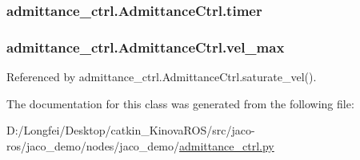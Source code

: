 \subsubsection[{\texorpdfstring{timer}{timer}}]{\setlength{\rightskip}{0pt plus 5cm}admittance\+\_\+ctrl.\+Admittance\+Ctrl.\+timer}\hypertarget{classadmittance__ctrl_1_1AdmittanceCtrl_a83d7b0847cefa7749b3d4a9672c4d1c4}{}\label{classadmittance__ctrl_1_1AdmittanceCtrl_a83d7b0847cefa7749b3d4a9672c4d1c4}
\subsubsection[{\texorpdfstring{vel\+\_\+max}{vel_max}}]{\setlength{\rightskip}{0pt plus 5cm}admittance\+\_\+ctrl.\+Admittance\+Ctrl.\+vel\+\_\+max}\hypertarget{classadmittance__ctrl_1_1AdmittanceCtrl_a2d0c030242f05f5aed46ce03810d721a}{}\label{classadmittance__ctrl_1_1AdmittanceCtrl_a2d0c030242f05f5aed46ce03810d721a}


Referenced by admittance\+\_\+ctrl.\+Admittance\+Ctrl.\+saturate\+\_\+vel().



The documentation for this class was generated from the following file\+:\begin{DoxyCompactItemize}
\item 
D\+:/\+Longfei/\+Desktop/catkin\+\_\+\+Kinova\+R\+O\+S/src/jaco-\/ros/jaco\+\_\+demo/nodes/jaco\+\_\+demo/\hyperlink{admittance__ctrl_8py}{admittance\+\_\+ctrl.\+py}\end{DoxyCompactItemize}
